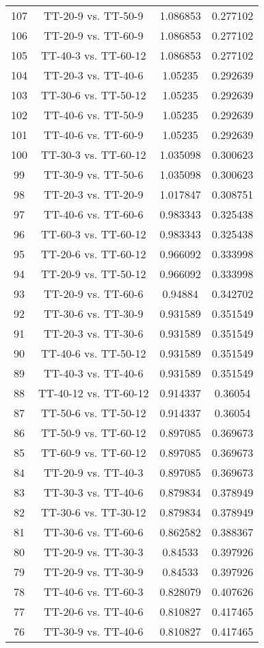 \documentclass[a4paper,10pt]{article}
\begin{document}
\begin{landscape}
\begin{table}[!htp]
\begin{tabular}{cccc}
107&TT-20-9 vs. TT-50-9&1.086853&0.277102\\
106&TT-20-9 vs. TT-60-9&1.086853&0.277102\\
105&TT-40-3 vs. TT-60-12&1.086853&0.277102\\
104&TT-20-3 vs. TT-40-6&1.05235&0.292639\\
103&TT-30-6 vs. TT-50-12&1.05235&0.292639\\
102&TT-40-6 vs. TT-50-9&1.05235&0.292639\\
101&TT-40-6 vs. TT-60-9&1.05235&0.292639\\
100&TT-30-3 vs. TT-60-12&1.035098&0.300623\\
99&TT-30-9 vs. TT-50-6&1.035098&0.300623\\
98&TT-20-3 vs. TT-20-9&1.017847&0.308751\\
97&TT-40-6 vs. TT-60-6&0.983343&0.325438\\
96&TT-60-3 vs. TT-60-12&0.983343&0.325438\\
95&TT-20-6 vs. TT-60-12&0.966092&0.333998\\
94&TT-20-9 vs. TT-50-12&0.966092&0.333998\\
93&TT-20-9 vs. TT-60-6&0.94884&0.342702\\
92&TT-30-6 vs. TT-30-9&0.931589&0.351549\\
91&TT-20-3 vs. TT-30-6&0.931589&0.351549\\
90&TT-40-6 vs. TT-50-12&0.931589&0.351549\\
89&TT-40-3 vs. TT-40-6&0.931589&0.351549\\
88&TT-40-12 vs. TT-60-12&0.914337&0.36054\\
87&TT-50-6 vs. TT-50-12&0.914337&0.36054\\
86&TT-50-9 vs. TT-60-12&0.897085&0.369673\\
85&TT-60-9 vs. TT-60-12&0.897085&0.369673\\
84&TT-20-9 vs. TT-40-3&0.897085&0.369673\\
83&TT-30-3 vs. TT-40-6&0.879834&0.378949\\
82&TT-30-6 vs. TT-30-12&0.879834&0.378949\\
81&TT-30-6 vs. TT-60-6&0.862582&0.388367\\
80&TT-20-9 vs. TT-30-3&0.84533&0.397926\\
79&TT-20-9 vs. TT-30-9&0.84533&0.397926\\
78&TT-40-6 vs. TT-60-3&0.828079&0.407626\\
77&TT-20-6 vs. TT-40-6&0.810827&0.417465\\
76&TT-30-9 vs. TT-40-6&0.810827&0.417465\\

\end{tabular}
\end{table}
\end{landscape}
\end{document}
